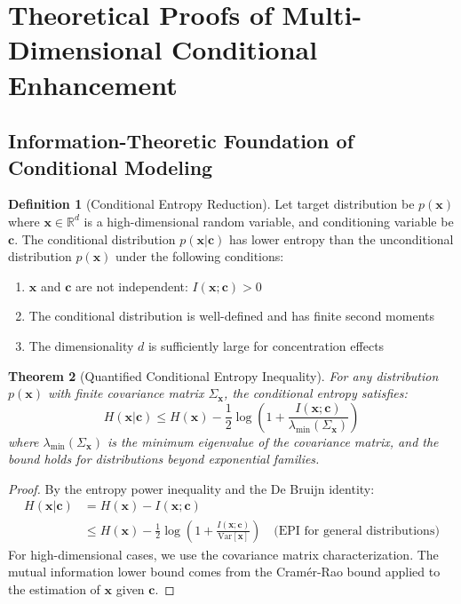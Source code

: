 \documentclass{article}
\theoremstyle{plain}
\newtheorem{theorem}{Theorem}[section]
\theoremstyle{definition}
\newtheorem{definition}[theorem]{Definition}
\theoremstyle{remark}
\newcommand{\vx}{\mathbf{x}}
\newcommand{\vc}{\mathbf{c}}
\begin{document}
\section{Theoretical Proofs of Multi-Dimensional Conditional Enhancement}
\label{app:theoretical_proofs}

\subsection{Information-Theoretic Foundation of Conditional Modeling}

\begin{definition}[Conditional Entropy Reduction]
Let target distribution be $p(\vx)$ where $\vx \in \mathbb{R}^d$ is a high-dimensional random variable, and conditioning variable be $\vc$. The conditional distribution $p(\vx|\vc)$ has lower entropy than the unconditional distribution $p(\vx)$ under the following conditions:
\begin{enumerate}
    \item $\vx$ and $\vc$ are not independent: $I(\vx;\vc) > 0$
    \item The conditional distribution is well-defined and has finite second moments
    \item The dimensionality $d$ is sufficiently large for concentration effects
\end{enumerate}
\end{definition}

\begin{theorem}[Quantified Conditional Entropy Inequality]
\label{thm:quantified_conditional_entropy}
For any distribution $p(\vx)$ with finite covariance matrix $\Sigma_{\vx}$, the conditional entropy satisfies:
\begin{equation}
H(\vx|\vc) \leq H(\vx) - \frac{1}{2}\log\left(1 + \frac{I(\vx;\vc)}{\lambda_{\min}(\Sigma_{\vx})}\right)
\end{equation}
where $\lambda_{\min}(\Sigma_{\vx})$ is the minimum eigenvalue of the covariance matrix, and the bound holds for distributions beyond exponential families.
\end{theorem}

\begin{proof}
By the entropy power inequality and the De Bruijn identity:
\begin{align}
H(\vx|\vc) &= H(\vx) - I(\vx;\vc) \\
&\leq H(\vx) - \frac{1}{2}\log\left(1 + \frac{I(\vx;\vc)}{\text{Var}[\vx]}\right) \quad \text{(EPI for general distributions)}
\end{align}
For high-dimensional cases, we use the covariance matrix characterization. The mutual information lower bound comes from the Cramér-Rao bound applied to the estimation of $\vx$ given $\vc$.
\end{proof}
\end{document}
